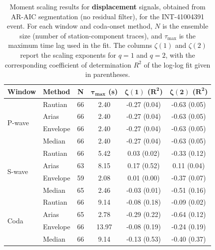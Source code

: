 \begin{table}[H]
\centering
\small
\begin{tabular}{llcccc}
\toprule
\textbf{Window} & \textbf{Method} & \textbf{N} & $\bm{\tau_{\max}}$ \textbf{(s)} & $\bm{\zeta(1)}$ \textbf{(}$\bm{R^2}$\textbf{)} & $\bm{\zeta(2)}$ \textbf{(}$\bm{R^2}$\textbf{)} \\
\midrule
\multirow{4}{*}{P-wave}
& Rautian & 66 & 2.40 & -0.27 (0.04) & -0.63 (0.05) \\
& Arias & 66 & 2.40 & -0.27 (0.04) & -0.63 (0.05) \\
& Envelope & 66 & 2.40 & -0.27 (0.04) & -0.63 (0.05) \\
& Median & 66 & 2.40 & -0.27 (0.04) & -0.63 (0.05) \\
\midrule
\multirow{4}{*}{S-wave}
& Rautian & 66 & 5.42 & 0.03 (0.02) & -0.33 (0.12) \\
& Arias & 63 & 8.15 & 0.17 (0.52) & 0.11 (0.04) \\
& Envelope & 59 & 2.08 & 0.01 (0.00) & -0.37 (0.07) \\
& Median & 65 & 2.46 & -0.03 (0.01) & -0.51 (0.16) \\
\midrule
\multirow{4}{*}{Coda}
& Rautian & 66 & 9.14 & -0.08 (0.18) & -0.09 (0.02) \\
& Arias & 65 & 2.78 & -0.29 (0.22) & -0.64 (0.12) \\
& Envelope & 66 & 13.97 & -0.08 (0.19) & -0.24 (0.19) \\
& Median & 66 & 9.14 & -0.13 (0.53) & -0.40 (0.37) \\
\bottomrule
\end{tabular}
\caption{Moment scaling results for \textbf{displacement} signals, obtained from AR-AIC segmentation (no residual filter), for the INT-41004391 event. For each window and coda-onset method, $N$ is the ensemble size (number of station-component traces), and $\tau_{\max}$ is the maximum time lag used in the fit. The columns $\zeta(1)$ and $\zeta(2)$ report the scaling exponents for $q=1$ and $q=2$, with the corresponding coefficient of determination $R^2$ of the log-log fit given in parentheses.}
\label{tab:ar_aic_scaling_disp_nothresh_queyras}
\end{table}